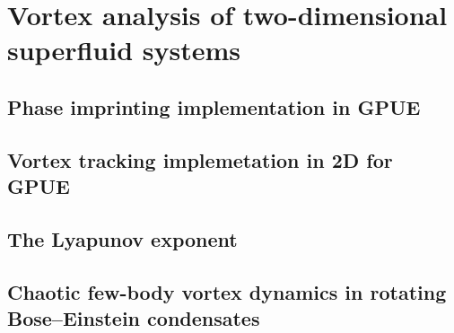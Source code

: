 \chapter{Vortex analysis of two-dimensional superfluid systems}
\label{ch-2d}

\section{Phase imprinting implementation in GPUE}
\section{Vortex tracking implemetation in 2D for GPUE}
\section{The Lyapunov exponent}

\section{Chaotic few-body vortex dynamics in rotating Bose--Einstein condensates}
